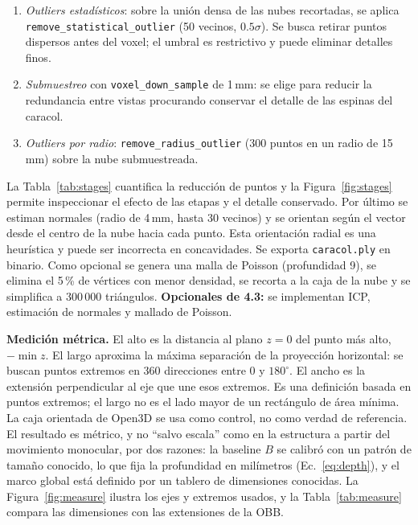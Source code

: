 \documentclass[10pt,a4paper]{article}
\begin{document}
\begin{enumerate}
Sección~\ref{sec:fusion}, además del RMSE de ajuste del procesamiento final.
\item \emph{Outliers estadísticos}: sobre la unión densa de las nubes recortadas, se aplica
\texttt{remove\_statistical\_outlier} (50 vecinos, $0.5\sigma$). Se busca retirar puntos
dispersos antes del voxel; el umbral es restrictivo y puede eliminar detalles finos.
\item \emph{Submuestreo} con \texttt{voxel\_down\_sample} de 1\,mm: se elige para reducir la
redundancia entre vistas procurando conservar el detalle de las espinas del caracol.
\item \emph{Outliers por radio}: \texttt{remove\_radius\_outlier} (300 puntos en un radio de
15\,mm) sobre la nube submuestreada.
\end{enumerate}
La Tabla~\ref{tab:stages} cuantifica la reducción de puntos y la Figura~\ref{fig:stages}
permite inspeccionar el efecto de las etapas y el detalle conservado.
Por último se estiman normales (radio de 4\,mm, hasta 30 vecinos) y se orientan según el
vector desde el centro de la nube hacia cada punto. Esta orientación radial es una
heurística y puede ser incorrecta en concavidades. Se exporta \texttt{caracol.ply} en binario.
Como opcional se genera una malla de Poisson (profundidad 9), se elimina el 5\,\% de vértices
con menor densidad, se recorta a la caja de la nube y se simplifica a 300\,000 triángulos.
\textbf{Opcionales de 4.3:} se implementan ICP, estimación de normales y mallado de Poisson.

\textbf{Medición métrica.} El alto es la distancia al plano $z=0$ del punto más alto,
$-\min z$. El largo aproxima la máxima separación de la proyección horizontal: se buscan
puntos extremos en 360 direcciones entre $0$ y $180^\circ$. El ancho es la extensión
perpendicular al eje que une esos extremos. Es una definición basada en puntos extremos;
el largo no es el lado mayor de un rectángulo de área mínima. La caja orientada de Open3D
se usa como control, no como verdad de referencia. El resultado es métrico, y no ``salvo
escala'' como en la estructura a partir del movimiento monocular, por dos razones: la baseline
$B$ se calibró con un patrón de tamaño conocido, lo que fija la profundidad en milímetros
(Ec.~\eqref{eq:depth}), y el marco global está definido por un tablero de dimensiones conocidas.
La Figura~\ref{fig:measure} ilustra los ejes y extremos usados, y la
Tabla~\ref{tab:measure} compara las dimensiones con las extensiones de la OBB.

\end{document}

